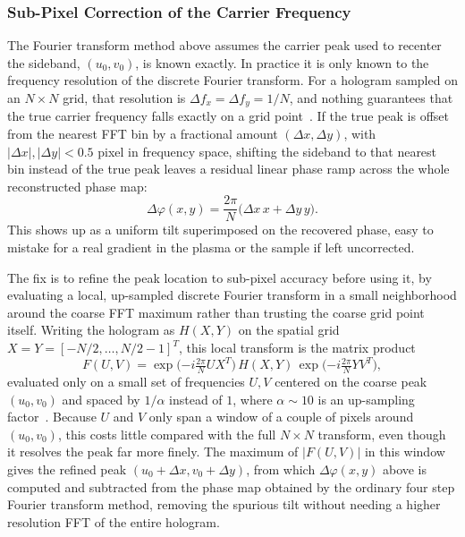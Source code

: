 \subsubsection{Sub-Pixel Correction of the Carrier Frequency}

The Fourier transform method above assumes the carrier peak used to recenter the sideband, $(u_0,v_0)$, is known exactly. In practice it is only known to the frequency resolution of the discrete Fourier transform. For a hologram sampled on an $N\times N$ grid, that resolution is $\Delta f_x=\Delta f_y=1/N$, and nothing guarantees that the true carrier frequency falls exactly on a grid point~\cite{khare2023fourier}. If the true peak is offset from the nearest FFT bin by a fractional amount $(\Delta x,\Delta y)$, with $|\Delta x|,|\Delta y|<0.5$ pixel in frequency space, shifting the sideband to that nearest bin instead of the true peak leaves a residual linear phase ramp across the whole reconstructed phase map:
\begin{equation}
\Delta\varphi(x,y) = \frac{2\pi}{N}\big(\Delta x\, x + \Delta y\, y\big).
\end{equation}
This shows up as a uniform tilt superimposed on the recovered phase, easy to mistake for a real gradient in the plasma or the sample if left uncorrected.

The fix is to refine the peak location to sub-pixel accuracy before using it, by evaluating a local, up-sampled discrete Fourier transform in a small neighborhood around the coarse FFT maximum rather than trusting the coarse grid point itself. Writing the hologram as $H(X,Y)$ on the spatial grid $X=Y=[-N/2,\dots,N/2-1]^T$, this local transform is the matrix product
\begin{equation}
F(U,V) = \exp\!\Big({-i\tfrac{2\pi}{N}UX^T}\Big)\,H(X,Y)\,\exp\!\Big({-i\tfrac{2\pi}{N}YV^T}\Big),
\end{equation}
evaluated only on a small set of frequencies $U,V$ centered on the coarse peak $(u_0,v_0)$ and spaced by $1/\alpha$ instead of $1$, where $\alpha\sim10$ is an up-sampling factor~\cite{khare2023fourier}. Because $U$ and $V$ only span a window of a couple of pixels around $(u_0,v_0)$, this costs little compared with the full $N\times N$ transform, even though it resolves the peak far more finely. The maximum of $|F(U,V)|$ in this window gives the refined peak $(u_0+\Delta x, v_0+\Delta y)$, from which $\Delta\varphi(x,y)$ above is computed and subtracted from the phase map obtained by the ordinary four step Fourier transform method, removing the spurious tilt without needing a higher resolution FFT of the entire hologram.



